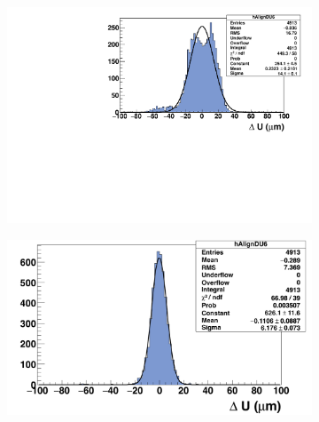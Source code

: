 \begin{figure}[!h]
    \begin{subfigure}[t]{0.45\textwidth}
      \centering
      \includegraphics[width = \textwidth]{Pictures/deformation/deltaU_6_deformed.pdf}
      \caption{}
      \label{fig:scatterDU_deformed_back}
    \end{subfigure}
    \hfill
    \begin{subfigure}[t]{0.45\textwidth}
      \centering
      \includegraphics[width = \textwidth]{Pictures/deformation/deltaU_6_corrected1.png}
      \caption{}
      \label{fig:residualU_corrected_back}
    \end{subfigure}

\end{figure}
